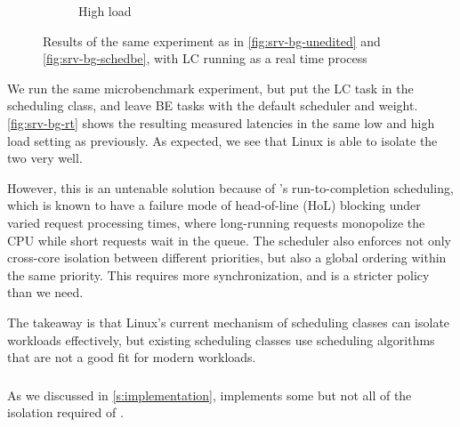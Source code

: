 \begin{figure}[t]
\begin{subfigure}[t]{0.48\columnwidth}
        \caption{High load}\label{fig:srv-bg-rt-high}
    \end{subfigure}
    \vspace{4pt}
    \caption{Results of the same experiment as in \autoref{fig:srv-bg-unedited}
    and \autoref{fig:srv-bg-schedbe}, with LC running as a real time
    process}\label{fig:srv-bg-rt}
\end{figure}

We run the same microbenchmark experiment, but put the LC task in the
\fifoclass{} scheduling class, and leave BE tasks with the default
\normalclass{} scheduler and weight. \autoref{fig:srv-bg-rt} shows the resulting
measured latencies in the same low and high load setting as previously. As
expected, we see that Linux is able to isolate the two very well.

However, this is an untenable solution because of \fifoclass{}'s
run-to-completion scheduling, which is known to have a failure mode of
head-of-line (HoL) blocking under varied request processing times, where
long-running requests monopolize the CPU while short requests wait in the queue.
The \fifoclass{} scheduler also enforces not only cross-core isolation between
different priorities, but also a global ordering within the same priority. This
requires more synchronization, and is a stricter policy than we need.

The takeaway is that Linux's current mechanism of scheduling classes can isolate
workloads effectively, but existing scheduling classes use scheduling
algorithms that are not a good fit for modern workloads.

\subsubsection{\schedidle}\label{ss:schedidle}

As we discussed in \autoref{s:implementation}, \schedidle{} implements some but
not all of the isolation required of \beclass{}.

